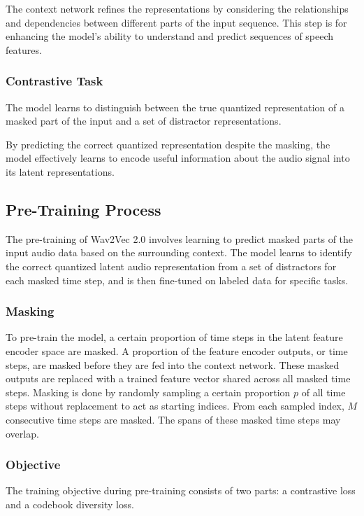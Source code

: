 \documentclass{article}
\begin{document}
The context network refines the representations by considering the relationships and dependencies between different parts of the input sequence. This step is for enhancing the model's ability to understand and predict sequences of speech features.


\subsubsection{Contrastive Task}

The model learns to distinguish between the true quantized representation of a masked part of the input and a set of distractor representations.

By predicting the correct quantized representation despite the masking, the model effectively learns to encode useful information about the audio signal into its latent representations.

\pagebreak


\subsection{Pre-Training Process}

The pre-training of Wav2Vec 2.0 involves learning to predict masked parts of the input audio data based on the surrounding context. The model learns to identify the correct quantized latent audio representation from a set of distractors for each masked time step, and is then fine-tuned on labeled data for specific tasks.

\subsubsection{Masking}

To pre-train the model, a certain proportion of time steps in the latent feature encoder space are masked. A proportion of the feature encoder outputs, or time steps, are masked before they are fed into the context network. These masked outputs are replaced with a trained feature vector shared across all masked time steps. Masking is done by randomly sampling a certain proportion \( p \) of all time steps without replacement to act as starting indices. From each sampled index, \( M \) consecutive time steps are masked. The spans of these masked time steps may overlap.

\subsubsection{Objective}
The training objective during pre-training consists of two parts: a contrastive loss and a codebook diversity loss.
\end{document}

